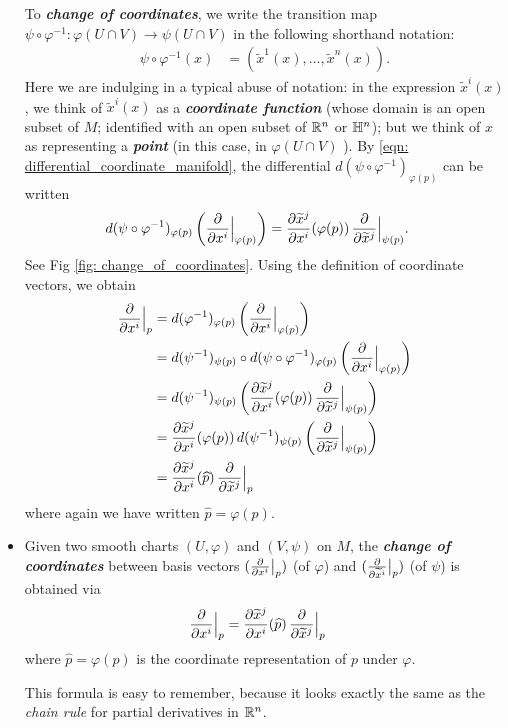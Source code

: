 \documentclass[11pt]{article}
\begin{document}
\begin{itemize}
To \emph{\textbf{change of coordinates}}, we write the transition map $\psi \circ \varphi^{-1}: \varphi(U \cap V) \rightarrow \psi(U \cap V)$ in the following shorthand notation:
\begin{align*}
\psi \circ \varphi^{-1}(x) &= (\widetilde{x}^{1}(x), \ldots, \widetilde{x}^{n}(x)).
\end{align*}
Here we are indulging in a typical abuse of notation: in the expression $\widetilde{x}^{i}(x)$, we
think of $\widetilde{x}^{i}(x)$ as a \emph{\textbf{coordinate function}} (whose domain is an open subset of $M$; identified with an open subset of ${\mathbb R}^n$ or ${\mathbb H}^n$); but we think of $x$ as representing a \emph{\textbf{point}} (in this case, in $\varphi(U \cap V)$ ). By \eqref{eqn: differential_coordinate_manifold}, the differential $d(\psi \circ \varphi^{-1})_{\varphi(p)}$ can be written 
\begin{align*}
d(\psi \circ \varphi^{-1})_{\varphi(p)}\left(\frac{\partial }{ \partial x^{i}}\Bigr|_{\varphi(p)}\right)
&=\frac{\partial \widetilde{x}^{j}}{ \partial x^{i}}(\varphi(p))\,\frac{\partial }{ \partial \widetilde{x}^{j}}\Bigr|_{\psi(p)}.
\end{align*} See Fig \ref{fig: change_of_coordinates}.  Using the definition of coordinate vectors, we obtain 
\begin{align*}
\frac{\partial }{ \partial x^{i}}\Bigr|_{p} &= d(\varphi^{-1})_{\varphi(p)}\left(\frac{\partial }{ \partial x^{i}}\Bigr|_{\varphi(p)}\right) \\
&= d(\psi^{-1})_{\psi(p)}\circ d(\psi \circ \varphi^{-1})_{\varphi(p)}\left(\frac{\partial }{ \partial x^{i}}\Bigr|_{\varphi(p)}\right) \\
&= d(\psi^{-1})_{\psi(p)}\left(\frac{\partial \widetilde{x}^{j}}{ \partial x^{i}}(\varphi(p))\,\frac{\partial }{ \partial \widetilde{x}^{j}}\Bigr|_{\psi(p)}\right) \\
&=\frac{\partial \widetilde{x}^{j}}{ \partial x^{i}}(\varphi(p))\,d(\psi^{-1})_{\psi(p)}\left(\frac{\partial }{ \partial \widetilde{x}^{j}}\Bigr|_{\psi(p)}\right) \\
&= \frac{\partial \widetilde{x}^{j}}{ \partial x^{i}}(\widehat{p})\,\frac{\partial }{ \partial \widetilde{x}^{j}}\Bigr|_{p} 
\end{align*} where again we have written $\widehat{p} = \varphi(p)$. 

\item \begin{remark}
Given two smooth charts $(U, \varphi)$ and $(V, \psi)$ on $M$, the \emph{\textbf{change of coordinates}} between basis vectors $(\frac{\partial }{ \partial x^{i}}\big|_{p})$ (of $\varphi$) and $(\frac{\partial }{ \partial \widetilde{x}^{i}}\big|_{p})$ (of $\psi$) is obtained via
\begin{align}
\frac{\partial }{ \partial x^{i}}\Bigr|_{p} &=  \frac{\partial \widetilde{x}^{j}}{ \partial x^{i}}(\widehat{p})\,\frac{\partial }{ \partial \widetilde{x}^{j}}\Bigr|_{p}   \label{eqn: change_of_coordinates}
\end{align} where $\widehat{p} = \varphi(p)$ is the coordinate representation of $p$ under $\varphi$. 
\end{remark}
This formula is easy to remember, because it looks exactly the same as the \emph{chain rule} for partial derivatives in ${\mathbb R}^n$.


\end{itemize}
\end{document}
